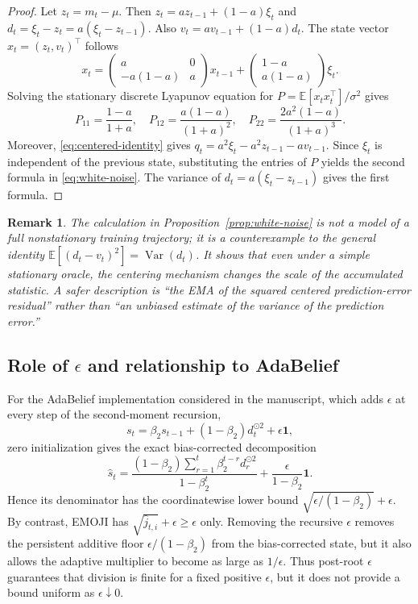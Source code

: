 \documentclass[11pt]{article}
\newtheorem{remark}[theorem]{Remark}
\newcommand{\E}{\mathbb{E}}
\begin{document}
\begin{proof}
Let $z_t=m_t-\mu$. Then $z_t=az_{t-1}+(1-a)\xi_t$ and $d_t=\xi_t-z_t=a(\xi_t-z_{t-1})$. Also $v_t=av_{t-1}+(1-a)d_t$. The state vector $x_t=(z_t,v_t)^\top$ follows
\[
 x_t=\begin{pmatrix}a&0\\-a(1-a)&a\end{pmatrix}x_{t-1}
 +\begin{pmatrix}1-a\\a(1-a)\end{pmatrix}\xi_t.
\]
Solving the stationary discrete Lyapunov equation for $P=\E[x_tx_t^\top]/\sigma^2$ gives
\[
 P_{11}=\frac{1-a}{1+a},\quad
 P_{12}=\frac{a(1-a)}{(1+a)^2},\quad
 P_{22}=\frac{2a^2(1-a)}{(1+a)^3}.
\]
Moreover, \eqref{eq:centered-identity} gives $q_t=a^2\xi_t-a^2z_{t-1}-av_{t-1}$. Since $\xi_t$ is independent of the previous state, substituting the entries of $P$ yields the second formula in \eqref{eq:white-noise}. The variance of $d_t=a(\xi_t-z_{t-1})$ gives the first formula.
\end{proof}

\begin{remark}
The calculation in Proposition~\ref{prop:white-noise} is not a model of a full nonstationary training trajectory; it is a counterexample to the general identity $\E[(d_t-v_t)^2]=\operatorname{Var}(d_t)$. It shows that even under a simple stationary oracle, the centering mechanism changes the scale of the accumulated statistic. A safer description is ``the EMA of the squared centered prediction-error residual'' rather than ``an unbiased estimate of the variance of the prediction error.''
\end{remark}

\subsection{Role of \texorpdfstring{$\epsilon$}{epsilon} and relationship to AdaBelief}
For the AdaBelief implementation considered in the manuscript, which adds $\epsilon$ at every step of the second-moment recursion,
\[
 s_t=\beta_2s_{t-1}+(1-\beta_2)d_t^{\odot2}+\epsilon\mathbf1,
\]
zero initialization gives the exact bias-corrected decomposition
\[
 \widehat s_t
 =\frac{(1-\beta_2)\sum_{r=1}^t\beta_2^{t-r}d_r^{\odot2}}{1-\beta_2^t}
 +\frac{\epsilon}{1-\beta_2}\mathbf1.
\]
Hence its denominator has the coordinatewise lower bound
$\sqrt{\epsilon/(1-\beta_2)}+\epsilon$. By contrast, EMOJI has
$\sqrt{\widehat j_{t,i}}+\epsilon\ge\epsilon$ only. Removing the recursive $\epsilon$ removes the persistent additive floor $\epsilon/(1-\beta_2)$ from the bias-corrected state, but it also allows the adaptive multiplier to become as large as $1/\epsilon$. Thus post-root $\epsilon$ guarantees that division is finite for a fixed positive $\epsilon$, but it does not provide a bound uniform as $\epsilon\downarrow0$.
\end{document}
